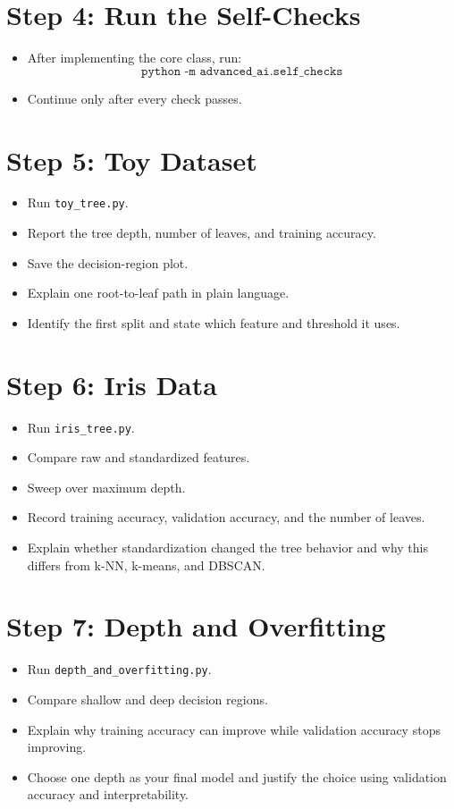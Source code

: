 \section*{Step 4: Run the Self-Checks}
\begin{itemize}
  \item After implementing the core class, run:
  \[
    \texttt{python -m advanced\_ai.self\_checks}
  \]
  \item Continue only after every check passes.
\end{itemize}

\section*{Step 5: Toy Dataset}
\begin{itemize}
  \item Run \texttt{toy\_tree.py}.
  \item Report the tree depth, number of leaves, and training accuracy.
  \item Save the decision-region plot.
  \item Explain one root-to-leaf path in plain language.
  \item Identify the first split and state which feature and threshold it uses.
\end{itemize}

\section*{Step 6: Iris Data}
\begin{itemize}
  \item Run \texttt{iris\_tree.py}.
  \item Compare raw and standardized features.
  \item Sweep over maximum depth.
  \item Record training accuracy, validation accuracy, and the number of leaves.
  \item Explain whether standardization changed the tree behavior and why this differs from k-NN, k-means, and DBSCAN.
\end{itemize}

\section*{Step 7: Depth and Overfitting}
\begin{itemize}
  \item Run \texttt{depth\_and\_overfitting.py}.
  \item Compare shallow and deep decision regions.
  \item Explain why training accuracy can improve while validation accuracy stops improving.
  \item Choose one depth as your final model and justify the choice using validation accuracy and interpretability.
\end{itemize}

